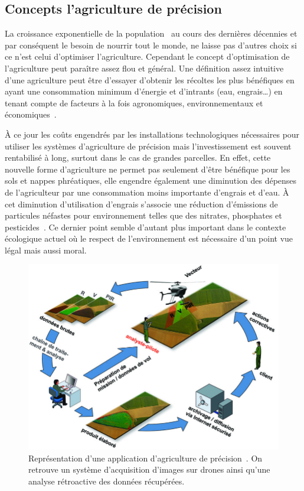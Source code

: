 \subsection{Concepts l'agriculture de précision}
La croissance exponentielle de la population~\cite{wiki:popu_mondiale}
au cours des dernières décennies et par conséquent le besoin de nourrir
tout le monde, ne laisse pas d'autres choix
si ce n'est celui d'optimiser l'agriculture.
Cependant le concept d'optimisation de l'agriculture peut 
paraître assez flou et général.
Une définition assez intuitive d'une agriculture peut être d'essayer d'obtenir
les récoltes les plus bénéfiques en ayant une consommation minimum d'énergie
et d'intrants (eau, engrais\dots) en tenant compte de facteurs à la fois
agronomiques, environnementaux et économiques~\cite{wiki:agri_prec}.

À ce jour les coûts engendrés par les installations technologiques
nécessaires pour utiliser les systèmes d'agriculture de précision
mais l'investissement est souvent rentabilisé à long, surtout 
dans le cas de grandes parcelles.
En effet, cette nouvelle forme d'agriculture ne permet pas seulement
d'être bénéfique pour les sols et nappes phréatiques,
elle engendre également une diminution des dépenses de l'agriculteur
par une consommation moins importante d'engrais et d'eau.
À cet diminution d'utilisation d'engrais s'associe une réduction
d'émissions de particules néfastes pour
environnement telles que des nitrates, phosphates
et pesticides~\cite{emission_agri_particules}.
Ce dernier point semble d'autant plus important dans le contexte
écologique actuel où le respect de l'environnement est nécessaire
d'un point vue légal mais aussi moral.

\begin{figure}
  \begin{center}
    \includegraphics[scale=0.42]{./img/agridrone.jpeg}
  \end{center}
  \caption{Représentation d'une application d'agriculture de 
  précision~\cite{vegedrones}.
  On retrouve un système d'acquisition d'images sur drones ainsi
  qu'une analyse rétroactive des données récupérées.}
\end{figure}